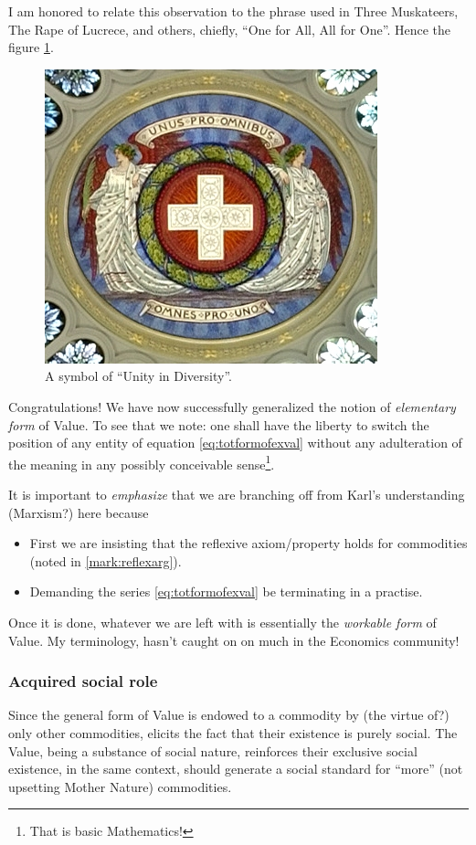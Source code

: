 \documentclass[12pt]{extarticle}
\theoremstyle{definition}
\begin{document}
 I am honored to relate this observation to the phrase used in Three Muskateers, The Rape of Lucrece, and others, chiefly, ``One for All, All for One''.  Hence the figure \ref{fig:alloneall}.
 \begin{figure}
   \centering
   \includegraphics[scale=3.5]{Unus_pro_omnibus,_omnes_pro_uno}
   \caption{A symbol of ``Unity in Diversity''.}
    \label{fig:alloneall}
  \end{figure}

  Congratulations! We have now successfully generalized the notion of \emph{elementary form} of Value.  To see that we note:  one shall have the liberty to switch the position of any entity of equation \ref{eq:totformofexval} without any adulteration of the meaning in any possibly conceivable sense\footnote{That is basic Mathematics!}.

  It is important to \emph{emphasize} that we are branching off from Karl's understanding (Marxism?) here because
 \begin{itemize}
  \item First we are insisting that the reflexive axiom/property holds for commodities (noted in \ref{mark:reflexarg}).
  \item Demanding the series \ref{eq:totformofexval} be terminating in a practise. 
  \end{itemize}
  Once it is done, whatever we are left with is essentially the \emph{workable form} of Value.  My terminology, hasn't caught on on much in the Economics community!

  \subsubsection{Acquired social role}
  Since the general form of Value is endowed to a commodity by (the virtue of?) only other commodities, elicits the fact that their existence is purely social. The Value, being a substance of social nature, reinforces their exclusive social existence, in the same context, should generate a social standard for ``more'' (not upsetting Mother Nature) commodities.
\end{document}

